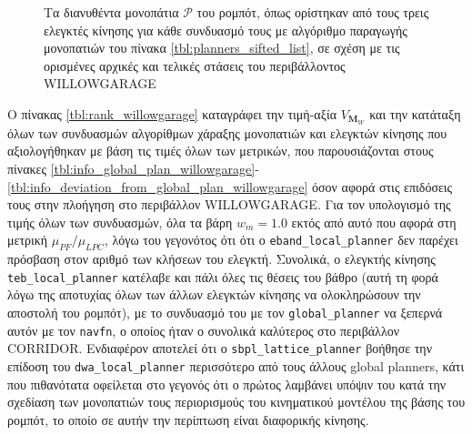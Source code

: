 \begin{figure}
\raggedright
  \begin{subfigure}[t]{\linewidth}
    \centering
    
  \end{subfigure}%
  \vspace{-1.5cm}
  \begin{subfigure}[t]{\linewidth}
    \centering
    
  \end{subfigure}%
  \vspace{-1.5cm}
  \begin{subfigure}[t]{\linewidth}
    \centering
    
  \end{subfigure}%
  \caption{\small Τα διανυθέντα μονοπάτια $\bm{\mathcal{P}}$ του ρομπότ, όπως
           ορίστηκαν από τους τρεις ελεγκτές κίνησης για κάθε συνδυασμό τους με
           αλγόριθμο παραγωγής μονοπατιών του πίνακα
           \ref{tbl:planners_sifted_list}, σε σχέση με τις ορισμένες αρχικές και
           τελικές στάσεις του περιβάλλοντος WILLOWGARAGE}
  \label{fig:ground_truths:willowgarage}
\end{figure}

Ο πίνακας \ref{tbl:rank_willowgarage} καταγράφει την τιμή-αξία $V_{\bm{M}_W}$
και την κατάταξη όλων των συνδυασμών αλγορίθμων χάραξης μονοπατιών και
ελεγκτών κίνησης που αξιολογήθηκαν με βάση τις τιμές όλων των μετρικών, που
παρουσιάζονται στους πίνακες \ref{tbl:info_global_plan_willowgarage}-
\ref{tbl:info_deviation_from_global_plan_willowgarage} όσον αφορά στις
επιδόσεις τους στην πλοήγηση στο περιβάλλον WILLOWGARAGE. Για τον υπολογισμό
της τιμής όλων των συνδυασμών, όλα τα βάρη $w_m = 1.0$ εκτός από αυτό που αφορά
στη μετρική $\mu_{PF} / \mu_{LPC}$, λόγω του γεγονότος ότι ότι ο
\texttt{eband\_local\_planner} δεν παρέχει πρόσβαση στον αριθμό των κλήσεων του
ελεγκτή. Συνολικά, ο ελεγκτής κίνησης \texttt{teb\_local\_planner} κατέλαβε και
πάλι όλες τις θέσεις του βάθρο (αυτή τη φορά λόγω της αποτυχίας όλων των άλλων
ελεγκτών κίνησης να ολοκληρώσουν την αποστολή του ρομπότ), με το συνδυασμό του
με τον \texttt{global\_planner} να ξεπερνά αυτόν με τον \texttt{navfn}, ο
οποίος ήταν ο συνολικά καλύτερος στο περιβάλλον CORRIDOR. Ενδιαφέρον αποτελεί
ότι ο \texttt{sbpl\_lattice\_planner} βοήθησε την επίδοση του
\texttt{dwa\_local\_planner} περισσότερο από τους άλλους global planners,
κάτι που πιθανότατα οφείλεται στο γεγονός ότι ο πρώτος λαμβάνει υπόψιν του
κατά την σχεδίαση των μονοπατιών τους περιορισμούς του κινηματικού μοντέλου
της βάσης του ρομπότ, το οποίο σε αυτήν την περίπτωση είναι διαφορικής κίνησης.


